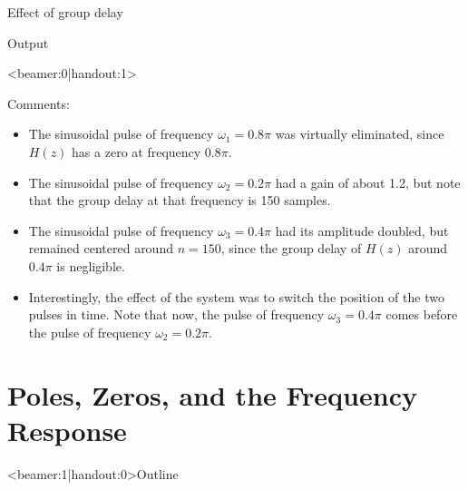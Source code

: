 \documentclass[10pt]{beamer}
\begin{document}
\begin{frame}{Effect of group delay}
\begin{block}{Output}
\begin{center}
		\end{center}	
	\end{block}
\end{frame}

\begin{frame}<beamer:0|handout:1>

Comments:
\begin{itemize}
	\item The sinusoidal pulse of frequency $\omega_1 = 0.8\pi$ was virtually eliminated, since $H(z)$ has a zero at frequency $0.8\pi$.
	\item The sinusoidal pulse of frequency $\omega_2 = 0.2\pi$ had a gain of about 1.2, but note that the group delay at that frequency is 150 samples.
	\item The sinusoidal pulse of frequency $\omega_3 = 0.4\pi$ had its amplitude doubled, but remained centered around $n = 150$, since the group delay of $H(z)$ around $0.4\pi$ is negligible.
	\item Interestingly, the effect of the system was to switch the position of the two pulses in time. Note that now, the pulse of frequency $\omega_3 = 0.4\pi$ comes before the pulse of frequency $\omega_2 = 0.2\pi$.
\end{itemize}

\end{frame}


%
\section{Poles, Zeros, and the Frequency Response}
\begin{frame}<beamer:1|handout:0>{Outline}
\tableofcontents[currentsection]
\end{frame}
\end{document}
